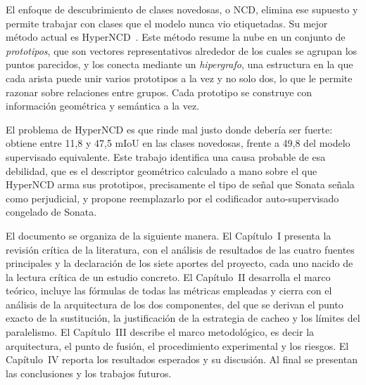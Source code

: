 El enfoque de descubrimiento de clases novedosas, o NCD, elimina ese supuesto y
permite trabajar con clases que el modelo nunca vio etiquetadas. Su mejor método
actual es HyperNCD~\cite{hyperncd}. Este método resume la nube en un conjunto de
\emph{prototipos}, que son vectores representativos alrededor de los cuales se
agrupan los puntos parecidos, y los conecta mediante un \emph{hipergrafo}, una
estructura en la que cada arista puede unir varios prototipos a la vez y no solo
dos, lo que le permite razonar sobre relaciones entre grupos. Cada prototipo se
construye con información geométrica y semántica a la vez.

El problema de HyperNCD es que rinde mal justo donde debería ser fuerte: obtiene entre 11,8 y 47,5 mIoU en las clases
novedosas, frente a 49,8 del modelo supervisado equivalente. Este trabajo
identifica una causa probable de esa debilidad, que es el descriptor geométrico
calculado a mano sobre el que HyperNCD arma sus prototipos, precisamente el tipo
de señal que Sonata señala como perjudicial, y propone reemplazarlo por el
codificador auto-supervisado congelado de Sonata.

El documento se organiza de la siguiente manera. El Capítulo~I presenta la
revisión crítica de la literatura, con el análisis de resultados de las cuatro
fuentes principales y la declaración de los siete aportes del proyecto, cada
uno nacido de la lectura crítica de un estudio concreto. El
Capítulo~II desarrolla el marco teórico, incluye las fórmulas de
todas las métricas empleadas y cierra con el análisis de la arquitectura de los
dos componentes, del que se derivan el punto exacto de la sustitución, la
justificación de la estrategia de cacheo y los límites del paralelismo. El
Capítulo~III describe el
marco metodológico, es decir la arquitectura, el punto de fusión, el
procedimiento experimental y los riesgos. El Capítulo~IV reporta los resultados
esperados y su discusión. Al final se presentan las conclusiones y los trabajos
futuros.


